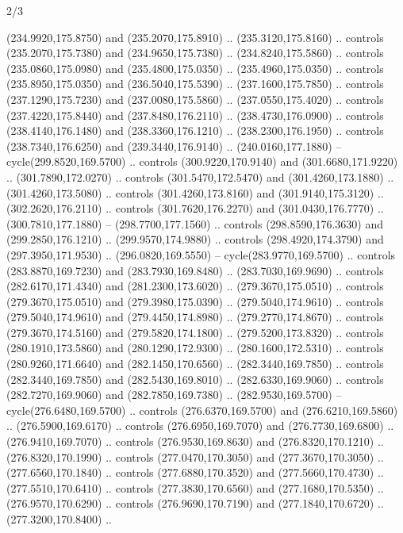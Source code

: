 \begin{flagdescription}{2/3}
\begin{scope}[xshift=0.5\flaglength,yshift=0.5\flagwidth,scale=\flagwidth/259.2]
\begin{scope}[y=0.8pt, x=0.8pt, yscale=-1,shift={(-243,-162)}]
      (234.9920,175.8750) and (235.2070,175.8910) .. (235.3120,175.8160) .. controls
      (235.2070,175.7380) and (234.9650,175.7380) .. (234.8240,175.5860) .. controls
      (235.0860,175.0980) and (235.4800,175.0350) .. (235.4960,175.0350) .. controls
      (235.8950,175.0350) and (236.5040,175.5390) .. (237.1600,175.7850) .. controls
      (237.1290,175.7230) and (237.0080,175.5860) .. (237.0550,175.4020) .. controls
      (237.4220,175.8440) and (237.8480,176.2110) .. (238.4730,176.0900) .. controls
      (238.4140,176.1480) and (238.3360,176.1210) .. (238.2300,176.1950) .. controls
      (238.7340,176.6250) and (239.3440,176.9140) .. (240.0160,177.1880) --
      cycle(299.8520,169.5700) .. controls (300.9220,170.9140) and
      (301.6680,171.9220) .. (301.7890,172.0270) .. controls (301.5470,172.5470) and
      (301.4260,173.1880) .. (301.4260,173.5080) .. controls (301.4260,173.8160) and
      (301.9140,175.3120) .. (302.2620,176.2110) .. controls (301.7620,176.2270) and
      (301.0430,176.7770) .. (300.7810,177.1880) -- (298.7700,177.1560) .. controls
      (298.8590,176.3630) and (299.2850,176.1210) .. (299.9570,174.9880) .. controls
      (298.4920,174.3790) and (297.3950,171.9530) .. (296.0820,169.5550) --
      cycle(283.9770,169.5700) .. controls (283.8870,169.7230) and
      (283.7930,169.8480) .. (283.7030,169.9690) .. controls (282.6170,171.4340) and
      (281.2300,173.6020) .. (279.3670,175.0510) .. controls (279.3670,175.0510) and
      (279.3980,175.0390) .. (279.5040,174.9610) .. controls (279.5040,174.9610) and
      (279.4450,174.8980) .. (279.2770,174.8670) .. controls (279.3670,174.5160) and
      (279.5820,174.1800) .. (279.5200,173.8320) .. controls (280.1910,173.5860) and
      (280.1290,172.9300) .. (280.1600,172.5310) .. controls (280.9260,171.6640) and
      (282.1450,170.6560) .. (282.3440,169.7850) .. controls (282.3440,169.7850) and
      (282.5430,169.8010) .. (282.6330,169.9060) .. controls (282.7270,169.9060) and
      (282.7850,169.7380) .. (282.9530,169.5700) -- cycle(276.6480,169.5700) ..
      controls (276.6370,169.5700) and (276.6210,169.5860) .. (276.5900,169.6170) ..
      controls (276.6950,169.7070) and (276.7730,169.6800) .. (276.9410,169.7070) ..
      controls (276.9530,169.8630) and (276.8320,170.1210) .. (276.8320,170.1990) ..
      controls (277.0470,170.3050) and (277.3670,170.3050) .. (277.6560,170.1840) ..
      controls (277.6880,170.3520) and (277.5660,170.4730) .. (277.5510,170.6410) ..
      controls (277.3830,170.6560) and (277.1680,170.5350) .. (276.9570,170.6290) ..
      controls (276.9690,170.7190) and (277.1840,170.6720) .. (277.3200,170.8400) ..

\end{scope}
\end{scope}
\end{flagdescription}

